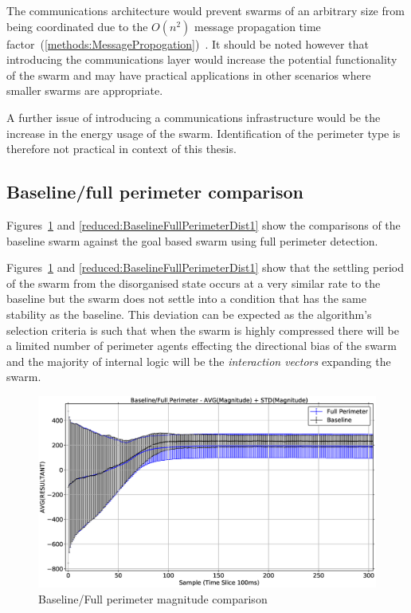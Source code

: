 The communications architecture would prevent swarms of an arbitrary size from being coordinated due to the $O(n^{2})$ message propagation time factor~(\autoref{methods:MessagePropogation})~\cite{SHA:07}. It should be noted however that introducing the communications layer would increase the potential functionality of the swarm and may have practical applications in other scenarios where smaller swarms are appropriate. 

A further issue of introducing a communications infrastructure would be the increase in the energy usage of the swarm. Identification of the perimeter type is therefore not practical in context of this thesis.

\subsection{Baseline/full perimeter comparison\label{section:compareBaselineFullPerimeter}}
Figures~\ref{reduced:BaselineFullPerimeterMag1} and \ref{reduced:BaselineFullPerimeterDist1} show the comparisons of the baseline swarm against the goal based swarm using full perimeter detection. 

Figures~\ref{reduced:BaselineFullPerimeterMag1} and \ref{reduced:BaselineFullPerimeterDist1} show that the settling period of the swarm from the disorganised state occurs at a very similar rate to the baseline but the swarm does not settle into a condition that has the same stability as the baseline. This deviation can be expected as the algorithm's selection criteria is such that when the swarm is highly compressed there will be a limited number of perimeter agents effecting the directional bias of the swarm and the majority of internal logic will be the \textit{interaction vectors} expanding the swarm.

\begin{figure}[H]
\begin{center}
\includegraphics[width=14cm]{CHAPTER-6/figures/BaselineFullPerimeterMag1}
\end{center}
\caption{Baseline/Full perimeter magnitude comparison\label{reduced:BaselineFullPerimeterMag1}}
\end{figure}

